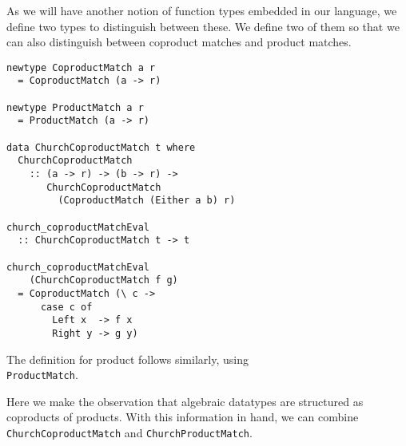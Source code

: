 \documentclass[sigplan,anonymous,review]{acmart}
\newcommand{\ttt}{\texttt}
\begin{document}
As we will have another notion of function types embedded in our language, we define two
types to distinguish between these. We define two of them so that we can also distinguish
between coproduct matches and product matches.

\begin{lstlisting}
newtype CoproductMatch a r
  = CoproductMatch (a -> r)

newtype ProductMatch a r
  = ProductMatch (a -> r)

data ChurchCoproductMatch t where
  ChurchCoproductMatch
    :: (a -> r) -> (b -> r) ->
       ChurchCoproductMatch
         (CoproductMatch (Either a b) r)

church_coproductMatchEval
  :: ChurchCoproductMatch t -> t

church_coproductMatchEval
    (ChurchCoproductMatch f g)
  = CoproductMatch (\ c ->
      case c of
        Left x  -> f x
        Right y -> g y)
\end{lstlisting}

The definition for product follows similarly, using \\ \ttt{ProductMatch}.

Here we make the observation that algebraic datatypes are structured as coproducts of products. With
this information in hand, we can combine \ttt{ChurchCoproductMatch} and \ttt{ChurchProductMatch}.
\end{document}
